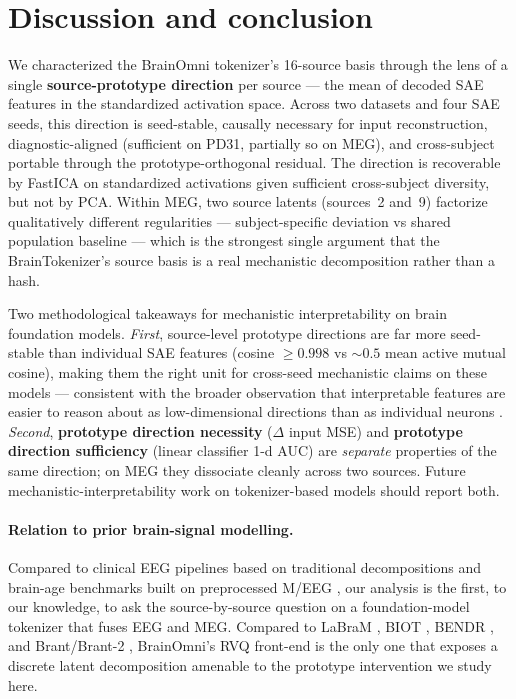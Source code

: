 \documentclass[11pt]{article}
\begin{document}
\section{Discussion and conclusion}\label{sec:discussion}

We characterized the BrainOmni tokenizer's 16-source basis through the lens of
a single \textbf{source-prototype direction} per source --- the mean of decoded
SAE features \cite{bricken2023monosemanticity,cunningham2024sae,gao2024scaling}
in the standardized activation space. Across two datasets and four SAE seeds,
this direction is seed-stable, causally necessary for input reconstruction,
diagnostic-aligned (sufficient on PD31, partially so on MEG), and
cross-subject portable through the prototype-orthogonal residual. The
direction is recoverable by FastICA on standardized activations given
sufficient cross-subject diversity, but not by PCA. Within MEG, two source
latents (sources~2 and~9) factorize qualitatively different regularities ---
subject-specific deviation vs shared population baseline --- which is the
strongest single argument that the BrainTokenizer's source basis is a real
mechanistic decomposition rather than a hash.

Two methodological takeaways for mechanistic interpretability on brain
foundation models. \emph{First}, source-level prototype directions are far
more seed-stable than individual SAE features (cosine $\geq 0.998$ vs
$\sim 0.5$ mean active mutual cosine), making them the right unit for
cross-seed mechanistic claims on these models --- consistent with the
broader observation that interpretable features are easier to reason
about as low-dimensional directions than as individual neurons
\cite{olah2020zoomin,park2024linear,marks2024sfc}. \emph{Second},
\textbf{prototype direction necessity} ($\Delta$ input MSE) and
\textbf{prototype direction sufficiency} (linear classifier 1-d AUC) are
\emph{separate} properties of the same direction; on MEG they dissociate
cleanly across two sources. Future mechanistic-interpretability work on
tokenizer-based models should report both.

\paragraph{Relation to prior brain-signal modelling.} Compared to clinical
{EEG} pipelines based on traditional decompositions
\cite{eegnet2018,schirrmeister2017} and brain-age benchmarks built on
preprocessed M/EEG \cite{engemann2022}, our analysis is the first, to our
knowledge, to ask the source-by-source question on a foundation-model
tokenizer that fuses {EEG} and {MEG}. Compared to {LaBraM}
\cite{labram2024}, {BIOT} \cite{biot2023}, {BENDR} \cite{bendr2021}, and
{Brant}/{Brant-2} \cite{brant2023,brant2_2024}, BrainOmni's RVQ
front-end is the only one that exposes a discrete latent decomposition
amenable to the prototype intervention we study here.
\end{document}
